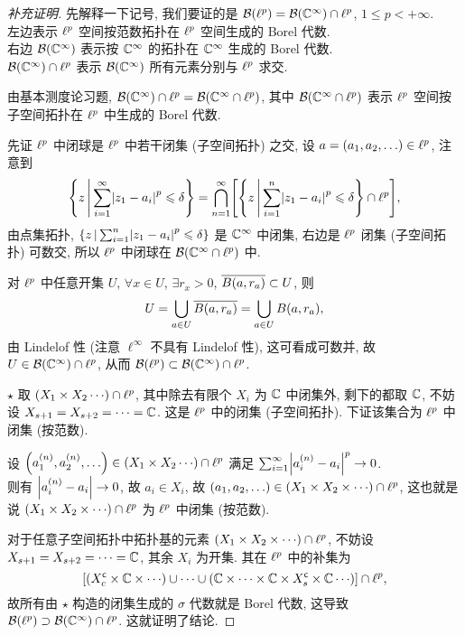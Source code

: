 \begin{proof}[补充证明]
先解释一下记号, 我们要证的是 $\BB\xk{\lp}=\BB\xk{\cc^{\infty}}\cap\lp$, $1\leq p<+\infty$.\\
左边表示 $\ell^p$ 空间按范数拓扑在 $\ell^p$ 空间生成的 Borel 代数.\\
右边 $\BB\xk{\cc^{\infty}}$ 表示按 $\mathbb{C}^{\infty}$ 的拓扑在 $\mathbb{C}^{\infty}$ 生成的 Borel 代数.\\
$\BB\xk{\cc^{\infty}}\cap\lp$ 表示 $\BB\xk{\cc^{\infty}}$ 所有元素分别与 $\ell^p$ 求交.\par
由基本测度论习题, $\BB\xk{\cc^\infty}\cap\lp=\BB\xk{\cc^\infty\cap\lp}$, 其中 $\BB\xk{\cc^{\infty}\cap\lp}$ 表示 $\ell^p$ 空间按子空间拓扑在 $\ell^p$ 中生成的 Borel 代数.\par
先证 $\ell^p$ 中闭球是 $\ell^p$ 中若干闭集 (子空间拓扑) 之交, 设 $a=\left(a_1,a_2,\ldots\right)\in\ell^p$, 注意到
\[\jh{z}{\sum_{i=1}^{\infty}\jd{z_1-a_i}^p\leqslant\delta}=\bigcap_{n=1}^{\infty}\zk{\jh{z}{\sum_{i=1}^{n}\jd{z_1-a_i}^p\leqslant\delta}\cap\lp},\]
由点集拓扑, $\jh{z}{\sum_{i=1}^{n}\jd{z_1-a_i}^p\leqslant\delta}$ 是 $\mathbb{C}^\infty$ 中闭集, 右边是 $\ell^p$ 闭集 (子空间拓扑) 可数交, 所以 $\ell^p$ 中闭球在 $\BB\xk{\cc^{\infty}\cap\lp}$ 中.\par
对 $\ell^p$ 中任意开集 $U$, $\forall x\in U$, $\exists r_x>0$, $\mean{B\xk{a,r_a}}\subset U$, 则 
\[U=\bigcup_{a\in U}\mean{B\xk{a,r_a}}=\bigcup_{a\in U}B\xk{a,r_a},\] 由 Lindelof 性 (注意 $\ell^\infty$ 不具有 Lindelof 性), 这可看成可数并, 故 $U\in\BB\xk{\cc^{\infty}}\cap\lp$, 从而 $\BB\xk{\lp}\subset\BB\xk{\cc^{\infty}}\cap\lp$.\par
 $\star$ 取 $\xk{X_1\times X_2\cdots}\cap\lp$, 其中除去有限个 $X_i$ 为 $\mathbb{C}$ 中闭集外, 剩下的都取 $\mathbb{C}$, 不妨设 $X_{s+1}=X_{s+2}=\cdots=\mathbb{C}$. 这是 $\ell^p$ 中的闭集 (子空间拓扑). 下证该集合为 $\ell^p$ 中闭集 (按范数).\par 
设 $\xk{a_1^{\xk{n}},a_2^{\xk{n}},\ldots}\in\xk{X_1\times X_2\cdots}\cap\lp$ 满足 $\sum_{i=1}^{\infty}\jd{a_i^{\xk{n}}-a_i}^p\to 0$.\\
则有 $\left\vert a_i^{\left(n\right)}-a_i\right\vert\to 0$, 故 $a_i\in X_i$, 故 $\xk{a_1,a_2,\ldots}\in\xk{X_1\times X_2\times\cdots}\cap\lp$, 这也就是说 $\xk{X_1\times X_2\times\cdots}\cap\lp$ 为 $\ell^p$ 中闭集 (按范数).\par 
对于任意子空间拓扑中拓扑基的元素 $\xk{X_1\times X_2\times\cdots}\cap\lp$, 不妨设 $X_{s+1}=X_{s+2}=\cdots=\mathbb{C}$, 其余 $X_i$ 为开集. 其在 $\ell^p$ 中的补集为
\[\zk{\xk{X_c\bu\times\cc\times\cdots}\cup\cdots\cup\xk{\cc\times\cdots\times\cc\times X_s\bu\times\cc\cdots}}\cap\lp,\]
故所有由 $\star$ 构造的闭集生成的 $\sigma$ 代数就是 Borel 代数, 这导致 $\BB\xk{\lp}\supset\BB\xk{\cc^{\infty}}\cap\lp$. 这就证明了结论.
\end{proof}

